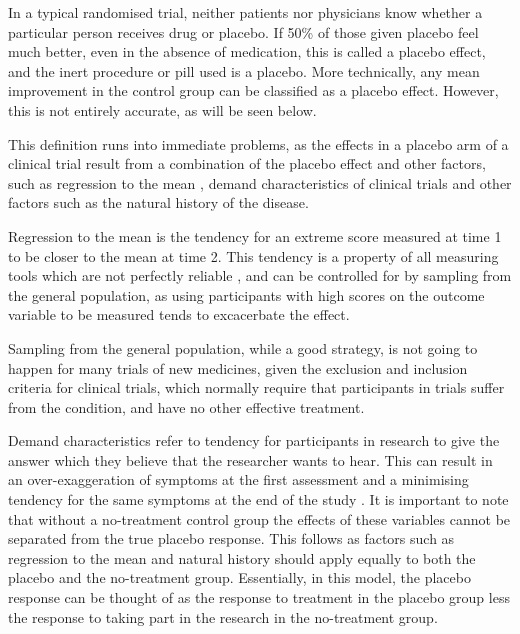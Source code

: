 In a typical randomised trial, neither patients nor physicians know whether a particular person receives drug or placebo.  If 50\% of those given placebo feel much better, even in the absence of medication, this is called a placebo effect, and the inert procedure or pill used is a placebo. More technically, any mean improvement in the control group can be classified as a placebo effect. However, this is not entirely accurate, as will be seen below.   

This definition runs into immediate problems, as the effects in a placebo arm of a clinical trial result from a combination of the placebo effect and other factors, such as regression to the mean \cite{Morton2003}, demand characteristics of clinical trials \cite{Hrobjartsson2001}  and other factors such as the natural history of the disease.   

Regression to the mean is the tendency for an extreme score measured at time 1 to be closer to the mean at time 2. This tendency is a property of all measuring tools which are not perfectly reliable \cite{Morton2003}, and can be controlled for by sampling from the general population, as using participants with high scores on the outcome variable to be measured tends to excacerbate the effect. 

Sampling from the general population, while a good strategy, is not going to happen for many trials of new medicines, given the exclusion and inclusion criteria for clinical trials, which normally require that participants in trials suffer from the condition, and have no other effective treatment.   

Demand characteristics \cite{Fernandez1994,weber1972subject} refer to tendency for participants in research to give the answer which they believe that the researcher wants to hear. This can result in an over-exaggeration of symptoms at the first assessment and a minimising tendency for the same symptoms at the end of the study \cite{Vase2005}.  It is important to note that without a no-treatment control group the effects of these variables cannot be separated from the true placebo response.  This follows as factors such as regression to the mean and natural history should apply equally to both the placebo and the no-treatment group.  Essentially, in this model, the placebo response can be thought of as the response to treatment in the placebo group less the response to taking part in the research in the no-treatment group. 

